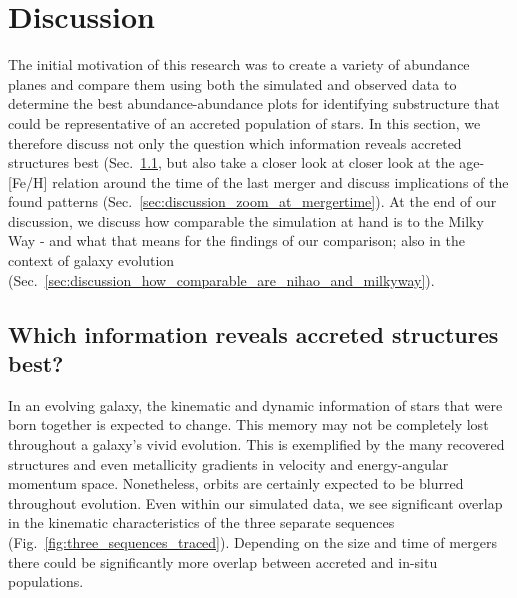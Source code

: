 \documentclass[fleqn,usenatbib]{mnras}
\begin{document}
\section{Discussion} \label{sec:discussion}

The initial motivation of this research was to create a variety of abundance planes and compare them using both the simulated and observed data to determine the best abundance-abundance plots for identifying substructure that could be representative of an accreted population of stars. In this section, we therefore discuss not only the question which information reveals accreted structures best (Sec.~\ref{sec:discussion_best_information}, but also take a closer look at  closer look at the age-[Fe/H] relation around the time of the last merger and discuss implications of the found patterns (Sec.~\ref{sec:discussion_zoom_at_mergertime}). At the end of our discussion, we discuss how comparable the simulation at hand is to the Milky Way - and what that means for the findings of our comparison; also in the context of galaxy evolution (Sec.~\ref{sec:discussion_how_comparable_are_nihao_and_milkyway}).

\subsection{Which information reveals accreted structures best?} \label{sec:discussion_best_information}

In an evolving galaxy, the kinematic and dynamic information of stars that were born together is expected to change. This memory may not be completely lost throughout a galaxy's vivid evolution. This is exemplified by the many recovered structures \citep{Deason2024} and even metallicity gradients \citep{Khoperskov2023d} in velocity and energy-angular momentum space. Nonetheless, orbits are certainly expected to be blurred throughout evolution. Even within our simulated data, we see significant overlap in the kinematic characteristics of the three separate sequences (Fig.~\ref{fig:three_sequences_traced}). Depending on the size and time of mergers there could be significantly more overlap between accreted and in-situ populations.
\end{document}
